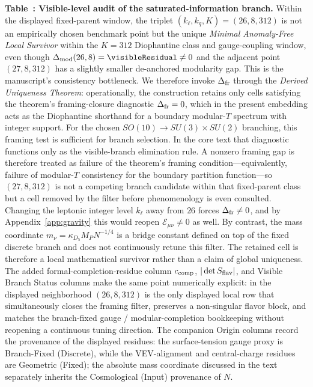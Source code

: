 \documentclass[11pt]{article}
\begin{document}
\noindent
{}\label{tab:visible-level-candidates}
\textbf{Table~\thetable: Visible-level audit of the saturated-information branch.}
Within the displayed fixed-parent window, the triplet $(k_{\ell},k_q,K)=(26,8,312)$ is not an empirically chosen benchmark point but the unique \emph{Minimal Anomaly-Free Local Survivor} within the $K=312$ Diophantine class and gauge-coupling window, even though $\Delta_{\rm mod}(26,8)=\visibleResidual\neq0$ and the adjacent point $(27,8,312)$ has a slightly smaller de-anchored modularity gap. This is the manuscript's consistency bottleneck. We therefore invoke $\Delta_{\rm fr}$ through the \emph{Derived Uniqueness Theorem}: operationally, the construction retains only cells satisfying the theorem's framing-closure diagnostic $\Delta_{\rm fr}=0$, which in the present embedding acts as the Diophantine shorthand for a boundary modular-$T$ spectrum with integer support. For the chosen $SO(10)\to SU(3)\times SU(2)$ branching, this framing test is sufficient for branch selection. In the core text that diagnostic functions only as the visible-branch elimination rule. A nonzero framing gap is therefore treated as failure of the theorem's framing condition---equivalently, failure of modular-$T$ consistency for the boundary partition function---so $(27,8,312)$ is not a competing branch candidate within that fixed-parent class but a cell removed by the filter before phenomenology is even consulted. Changing the leptonic integer level $k_{\ell}$ away from $26$ forces $\Delta_{\rm fr}\neq0$, and by Appendix~\ref{app:gravity} this would reopen $\mathcal E_{\mu\nu}\neq0$ as well. By contrast, the mass coordinate $m_\nu=\kappa_{D_5}M_PN^{-1/4}$ is a bridge constant defined on top of the fixed discrete branch and does not continuously retune this filter. The retained cell is therefore a local mathematical survivor rather than a claim of global uniqueness. The added formal-completion-residue column $c_{\rm comp}$, $|\det S_{\rm flav}|$, and Visible Branch Status columns make the same point numerically explicit: in the displayed neighborhood $(26,8,312)$ is the only displayed local row that simultaneously closes the framing filter, preserves a non-singular flavor block, and matches the branch-fixed gauge / modular-completion bookkeeping without reopening a continuous tuning direction. The companion Origin columns record the provenance of the displayed residues: the surface-tension gauge proxy is Branch-Fixed (Discrete), while the VEV-alignment and central-charge residues are Geometric (Fixed); the absolute mass coordinate discussed in the text separately inherits the Cosmological (Input) provenance of $N$.
\end{document}
